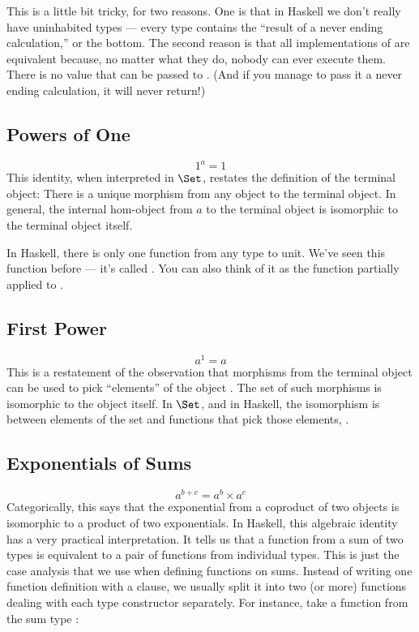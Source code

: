 This is a little bit tricky, for two reasons. One is that in Haskell we
don't really have uninhabited types --- every type contains the ``result
of a never ending calculation,'' or the bottom. The second reason is
that all implementations of  are equivalent because, no
matter what they do, nobody can ever execute them. There is no value
that can be passed to . (And if you manage to pass it a
never ending calculation, it will never return!)

\subsection{Powers of One}

\[1^{a} = 1\]
This identity, when interpreted in $\Set$, restates the definition
of the terminal object: There is a unique morphism from any object to
the terminal object. In general, the internal hom-object from $a$
to the terminal object is isomorphic to the terminal object itself.

In Haskell, there is only one function from any type  to unit.
We've seen this function before --- it's called . You can
also think of it as the function  partially applied to
\code{()}.

\subsection{First Power}

\[a^{1} = a\]
This is a restatement of the observation that morphisms from the
terminal object can be used to pick ``elements'' of the object
. The set of such morphisms is isomorphic to the object
itself. In $\Set$, and in Haskell, the isomorphism is between
elements of the set  and functions that pick those elements,
.

\subsection{Exponentials of Sums}

\[a^{b+c} = a^{b} \times a^{c}\]
Categorically, this says that the exponential from a coproduct of two
objects is isomorphic to a product of two exponentials. In Haskell, this
algebraic identity has a very practical interpretation. It tells us
that a function from a sum of two types is equivalent to a pair of
functions from individual types. This is just the case analysis that we
use when defining functions on sums. Instead of writing one function
definition with a  clause, we usually split it into two
(or more) functions dealing with each type constructor separately. For
instance, take a function from the sum type
:

